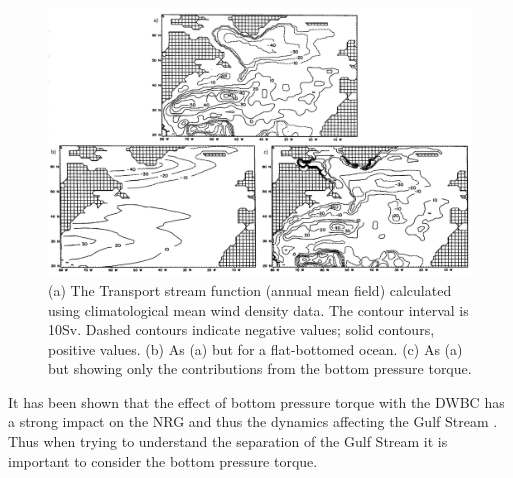 \documentclass[..\report.tex]{subfiles}
\begin{document}
\begin{figure}[t]
    \includegraphics[width=\linewidth]{Figures/Greatbatch1991Fig1Fig5Fig6.jpg}
    \caption{\citep[Figs. 1, 5 and 6]{Greatbatch1991} (a) The Transport stream function (annual mean field) calculated using climatological mean wind density data. The contour interval is 10Sv. Dashed contours indicate negative values; solid contours, positive values. (b) As (a) but for a flat-bottomed ocean. (c) As (a) but showing only the contributions from the bottom pressure torque.}
    \label{FIG:Greatbatch1991Fig1Fig5Fig6}
\end{figure}



It has been shown that the effect of bottom pressure torque with the \gls{DWBC} has a strong impact on the \gls{NRG} and thus the dynamics affecting the Gulf Stream \citep{Zhang2007}. Thus when trying to understand the separation of the Gulf Stream it is important to consider the bottom pressure torque.





\end{document}
